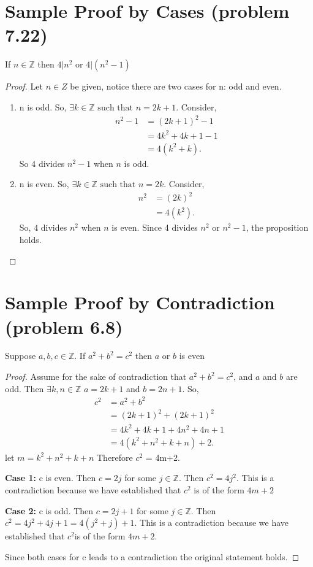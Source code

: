 \documentclass{article}
\newcommand{\Z}{\mathbb{Z}}
\newcommand{\st}{\text{ such that }}
\begin{document}
	\section*{Sample Proof by Cases (problem 7.22)}
	If $n \in \Z$ then $4|n^2$ or $4|(n^2-1)$
	\begin{proof}
		Let $n \in Z$ be given, notice there are two cases for n: odd and even. 
		\begin{enumerate}[label={ Case \arabic*:}]
			\item n is odd. So, $\exists k \in \Z  \st n= 2k+1$. Consider,
			\begin{align*}
			n^2-1 &= (2k+1)^2-1\\
				&= 4k^2+ 4k +1-1\\
				&= 4(k^2+k).
			\end{align*}
			So $4$ divides $n^2-1$ when $n$ is odd. 
			\item n is even. So, $\exists k \in \Z  \st n= 2k$. Consider,
			\begin{align*}
				n^2 &= (2k)^2\\
				&= 4(k^2).
			\end{align*}
			So, $4$ divides $n^2$ when $n$ is even. Since 4 divides $n^2$ or $n^2-1$, the proposition holds.
		\end{enumerate}
	\end{proof}

	\section*{Sample Proof by Contradiction (problem 6.8)}
	Suppose $a,b,c \in \Z$. If $a^2+b^2=c^2$ then $a$ or $b$ is even
	\begin{proof}
		Assume for the sake of contradiction that $a^2+b^2=c^2$, and $a$ and $b$ are odd. Then $\exists k,n\in \Z$ \st $a=2k+1$ and $b = 2n+1$. So,
		\begin{align*}
		c^2 &= a^2 + b^2\\
		&= (2k+1)^2 + (2k+1)^2\\
		&= 4k^2 + 4k + 1 + 4n^2 + 4n + 1 \\
		&= 4(k^2+n^2 + k + n) + 2.
		\end{align*}
		let $m= k^2+n^2 + k + n$ Therefore $c^2$ = 4m+2.
		
		\textbf{Case 1:} c is even.
		Then $c= 2j$ for some $j \in \Z$. Then $c^2 = 4j^2$.
		This is a contradiction because we have established that $c^2 $ is of the form $ 4m + 2$
		
		\textbf{Case 2:} c is odd.
		Then $c= 2j+1$ for some $j \in \Z$. Then $c^2 = 4j^2+4j+ 1 =4(j^2+j)+1$. 
		This is a contradiction because we have established that $c^2 $is of the form $ 4m + 2$.
		
		Since both cases for c leads to a contradiction the original statement holds. 
	\end{proof}
	
\end{document}
